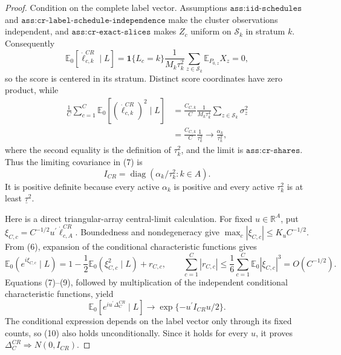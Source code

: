 \documentclass{article}
\begin{document}
\begin{proof}
Condition on the complete label vector.  Assumptions \(\texttt{ass:iid-schedules}\) and \(\texttt{ass:cr-label-schedule-independence}\) make the cluster observations independent, and \(\texttt{ass:cr-exact-slices}\) makes \(Z_c\) uniform on \(\mathcal S_k\) in stratum \(k\).  Consequently
\[
 \mathbb E_0[\dot\ell_{c,k}^{CR}\mid L]
 =\mathbf1\{L_c=k\}\frac1{M_k\tau_k^2}
   \sum_{z\in\mathcal S_k}\mathbb E_{P_{0,z}}X_z=0,            \tag{6}
\]
so the score is centered in its stratum.  Distinct score coordinates have zero product, while
\[
 \begin{aligned}
 \frac1C\sum_{c=1}^C
 \mathbb E_0[(\dot\ell_{c,k}^{CR})^2\mid L]
 &=\frac{C_{C,k}}C\frac1{M_k\tau_k^4}
   \sum_{z\in\mathcal S_k}\sigma_z^2\\
 &=\frac{C_{C,k}}C\frac1{\tau_k^2}
 \longrightarrow\frac{\alpha_k}{\tau_k^2},
 \end{aligned}                                                   \tag{7}
\]
where the second equality is the definition of \(\tau_k^2\), and the limit is \(\texttt{ass:cr-shares}\).  Thus the limiting covariance in (7) is
\[
 I_{CR}=\operatorname{diag}(\alpha_k/\tau_k^2:k\in A).           \tag{8}
\]
It is positive definite because every active \(\alpha_k\) is positive and every active \(\tau_k^2\) is at least \(\underline\tau^2\).

Here is a direct triangular-array central-limit calculation.  For fixed \(u\in\mathbb R^A\), put
\(\xi_{C,c}=C^{-1/2}u^{\prime}\dot\ell_{c,A}^{CR}\).  Boundedness and nondegeneracy give \(\max_c|\xi_{C,c}|\leq K_uC^{-1/2}\).  From (6), expansion of the conditional characteristic functions gives
\[
 \mathbb E_0(e^{i\xi_{C,c}}\mid L)
 =1-\frac12\mathbb E_0(\xi_{C,c}^2\mid L)+r_{C,c},
 \qquad
 \sum_{c=1}^C|r_{C,c}|\leq
 \frac16\sum_{c=1}^C\mathbb E_0|\xi_{C,c}|^3=O(C^{-1/2}).       \tag{9}
\]
Equations (7)--(9), followed by multiplication of the independent conditional characteristic functions, yield
\[
 \mathbb E_0\!\left[e^{iu^{\prime}\Delta_C^{CR}}\mid L\right]
 \longrightarrow \exp\{-u^{\prime}I_{CR}u/2\}.                 \tag{10}
\]
The conditional expression depends on the label vector only through its fixed counts, so (10) also holds unconditionally.  Since it holds for every \(u\), it proves
\(\Delta_C^{CR}\Rightarrow N(0,I_{CR})\).


\end{proof}
\end{document}
